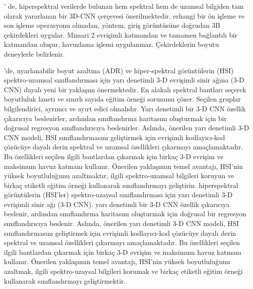 \citep{li2017spectral}' de, hiperspektral verilerde bulunan hem spektral hem de uzamsal bilgiden tam olarak yararlanan bir 3D-CNN çerçevesi önerilmektedir. erhangi bir ön işleme ve son işleme operasyonu olmadan, yöntem, giriş görüntüsüne doğrudan 3B çekirdekleri uygular.
Mimari 2 evrişimli katmandan ve tamamen bağlantılı bir katmandan oluşur, havuzlama işlemi uygulanmaz. Çekirdeklerin boyutu deneylerle belirlenir.

\citep{sellami2019hyperspectral}'de, uyarlanabilir boyut azaltma (ADR) ve hiper-spektral görüntülerin (HSI) spektro-uzamsal sınıflandırması için yarı denetimli 3-D evrişimli sinir ağına (3-D CNN) dayalı yeni bir yaklaşım önermektedir.
En alakalı spektral bantları seçerek boyutluluk laneti ve sınırlı sayıda eğitim örneği sorununu çözer.
Seçilen gruplar bilgilendirici, ayrımcı ve ayırt edici olmalıdır. Yarı denetimli bir 3-D CNN özellik çıkarıcıya beslenirler, ardından sınıflandırma haritasını oluşturmak için bir doğrusal regresyon sınıflandırıcıya beslenirler. Aslında, önerilen yarı denetimli 3-D CNN modeli, HSI sınıflandırmasını geliştirmek için evrişimli kodlayıcı-kod çözücüye dayalı derin spektral ve uzamsal özellikleri çıkarmayı amaçlamaktadır. Bu özellikleri seçilen ilgili bantlardan çıkarmak için birkaç 3-D evrişim ve maksimum havuz katmanı kullanır. Önerilen yaklaşımın temel avantajı, HSI'nin yüksek boyutluluğunu azaltmaktır,
ilgili spektro-uzamsal bilgileri koruyun ve birkaç etiketli eğitim örneği kullanarak sınıflandırmayı geliştirin. hiperspektral görüntülerin (HSI'ler) spektro-uzaysal sınıflandırması için yarı denetimli 3-D evrişimli sinir ağı (3-D CNN).
yarı denetimli bir 3-D CNN özellik çıkarıcıya beslenir, ardından sınıflandırma haritasını oluşturmak için doğrusal bir regresyon sınıflandırıcıya beslenir. Aslında, önerilen yarı denetimli 3-D CNN modeli, HSI sınıflandırmasını geliştirmek için evrişimli kodlayıcı-kod çözücüye dayalı derin spektral ve uzamsal özellikleri çıkarmayı amaçlamaktadır.
Bu özellikleri seçilen ilgili bantlardan çıkarmak için birkaç 3-D evrişim ve maksimum havuz katmanı kullanır. Önerilen yaklaşımın temel avantajı, HSI'nin yüksek boyutluluğunu azaltmak, ilgili spektro-uzaysal bilgileri korumak ve birkaç etiketli eğitim örneği kullanarak sınıflandırmayı geliştirmektir.


